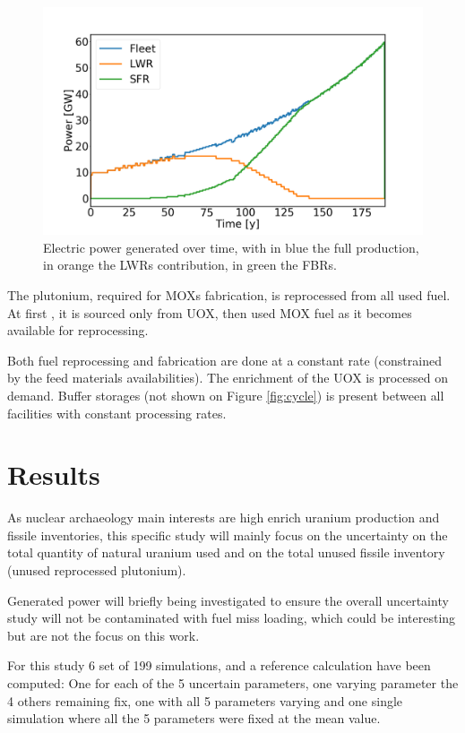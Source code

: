 \documentclass{anstrans}
\begin{document}
\begin{figure}[ht] %
    \centering
    \includegraphics[scale=0.18]{power.png}
    \caption{Electric power generated over time, with in blue the full production,
        in orange the \glspl{LWR} contribution, in green the \glspl{FBR}.}
    \label{fig:power}
\end{figure}


The plutonium, required for \glspl{MOX} fabrication, is reprocessed from all
used fuel.  At first , it is sourced only from UOX, then used MOX fuel as it becomes
available for reprocessing.

Both fuel reprocessing and fabrication are done at a constant rate (constrained
by the feed materials availabilities).  The enrichment of the UOX is processed on
demand.  Buffer storages (not shown on Figure \ref{fig:cycle}) is present between
all facilities with constant processing rates.


\section{Results}

As nuclear archaeology main interests are high enrich uranium production and
fissile inventories, this specific study will mainly focus on the uncertainty on
the total quantity of natural uranium used and on the total unused fissile
inventory (unused reprocessed plutonium).  

Generated power will briefly being investigated to ensure the overall
uncertainty study will not be contaminated with fuel miss loading, which could
be interesting but are not the focus on this work.

For this study 6 set of 199 simulations, and a reference calculation have been
computed: One for each of the 5 uncertain parameters, one varying parameter the
4 others remaining fix, one with all 5 parameters varying and one single
simulation where all the 5 parameters were fixed at the mean value. 
\end{document}
